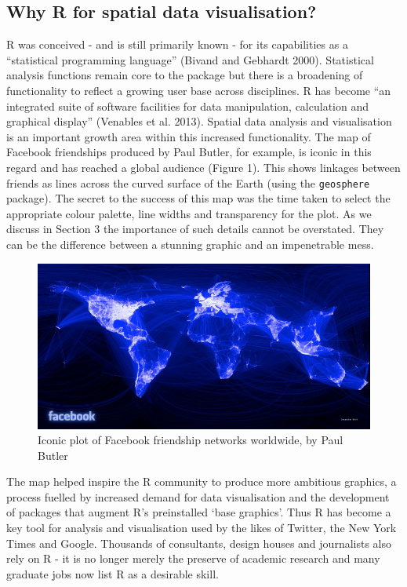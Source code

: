 \documentclass[]{article}
\begin{document}
\subsection{Why R for spatial data
visualisation?}\label{why-r-for-spatial-data-visualisation}

R was conceived - and is still primarily known - for its capabilities as
a ``statistical programming language'' (Bivand and Gebhardt 2000).
Statistical analysis functions remain core to the package but there is a
broadening of functionality to reflect a growing user base across
disciplines. R has become ``an integrated suite of software facilities
for data manipulation, calculation and graphical display'' (Venables et
al. 2013). Spatial data analysis and visualisation is an important
growth area within this increased functionality. The map of Facebook
friendships produced by Paul Butler, for example, is iconic in this
regard and has reached a global audience (Figure 1). This shows linkages
between friends as lines across the curved surface of the Earth (using
the \texttt{geosphere} package). The secret to the success of this map
was the time taken to select the appropriate colour palette, line widths
and transparency for the plot. As we discuss in Section 3 the importance
of such details cannot be overstated. They can be the difference between
a stunning graphic and an impenetrable mess.

\begin{figure}[htbp]
\centering
\includegraphics{figure/butler_facebook_2.jpg}
\caption{Iconic plot of Facebook friendship networks worldwide, by Paul
Butler}
\end{figure}

The map helped inspire the R community to produce more ambitious
graphics, a process fuelled by increased demand for data visualisation
and the development of packages that augment R's preinstalled `base
graphics'. Thus R has become a key tool for analysis and visualisation
used by the likes of Twitter, the New York Times and Google. Thousands
of consultants, design houses and journalists also rely on R - it is no
longer merely the preserve of academic research and many graduate jobs
now list R as a desirable skill.
\end{document}
